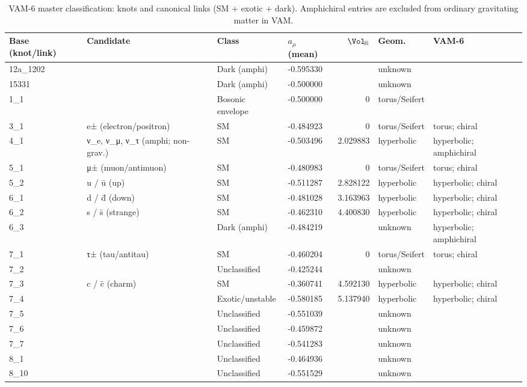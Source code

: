 \begin{table}[h!]
\centering
\small
\setlength{\tabcolsep}{5pt}
\caption{VAM-6 master classification: knots and canonical links (SM + exotic + dark). Amphichiral entries are excluded from ordinary gravitating matter in VAM.}
\label{tab:vam_master_full}
\begin{tabular}{llllrll}
\toprule
Base (knot/link) & Candidate & Class & $a_\mu$ (mean) & $\Vol_{\!\mathbb{H}}$ & Geom. & VAM-6 \\
\midrule
12a\_1202 &  & Dark (amphi) & -0.595330 &  & unknown &  \\
15331 &  & Dark (amphi) & -0.500000 &  & unknown &  \\
1\_1 &  & Bosonic envelope & -0.500000 & 0 & torus/Seifert &  \\
3\_1 & e± (electron/positron) & SM & -0.484923 & 0 & torus/Seifert & torus; chiral \\
4\_1 & ν\_e, ν\_μ, ν\_τ (amphi; non-grav.) & SM & -0.503496 & 2.029883 & hyperbolic & hyperbolic; amphichiral \\
5\_1 & μ± (muon/antimuon) & SM & -0.480983 & 0 & torus/Seifert & torus; chiral \\
5\_2 & u / ū (up) & SM & -0.511287 & 2.828122 & hyperbolic & hyperbolic; chiral \\
6\_1 & d / d̄ (down) & SM & -0.481028 & 3.163963 & hyperbolic & hyperbolic; chiral \\
6\_2 & s / s̄ (strange) & SM & -0.462310 & 4.400830 & hyperbolic & hyperbolic; chiral \\
6\_3 &  & Dark (amphi) & -0.484219 &  & unknown & hyperbolic; amphichiral \\
7\_1 & τ± (tau/antitau) & SM & -0.460204 & 0 & torus/Seifert & torus; chiral \\
7\_2 &  & Unclassified & -0.425244 &  & unknown &  \\
7\_3 & c / c̄ (charm) & SM & -0.360741 & 4.592130 & hyperbolic & hyperbolic; chiral \\
7\_4 &  & Exotic/unstable & -0.580185 & 5.137940 & hyperbolic & hyperbolic; chiral \\
7\_5 &  & Unclassified & -0.551039 &  & unknown &  \\
7\_6 &  & Unclassified & -0.459872 &  & unknown &  \\
7\_7 &  & Unclassified & -0.541283 &  & unknown &  \\
8\_1 &  & Unclassified & -0.464936 &  & unknown &  \\
8\_10 &  & Unclassified & -0.551529 &  & unknown &  \\

\end{tabular}
\end{table}
